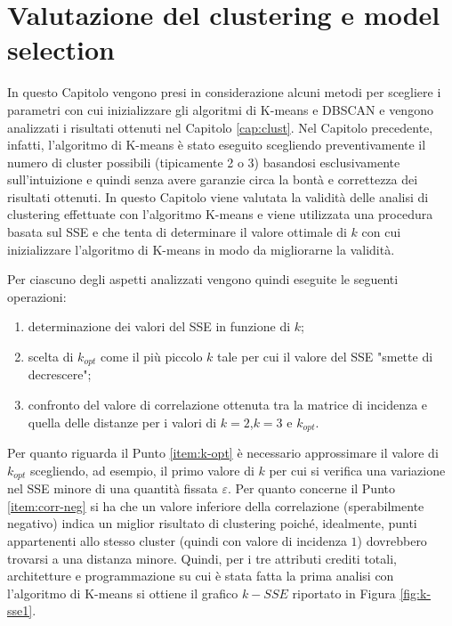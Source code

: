 \documentclass[12pt]{article}
\begin{document}
\section{Valutazione del clustering e model selection}
\label{cap:val-clust}
In questo Capitolo vengono presi in considerazione alcuni metodi per scegliere i parametri con cui inizializzare gli algoritmi di K-means e DBSCAN e vengono analizzati i risultati ottenuti nel Capitolo \ref{cap:clust}.
Nel Capitolo prece\-dente, infatti, l'algoritmo di K-means è stato eseguito scegliendo preventi\-vamente il numero di cluster possibili (tipicamente 2 o 3) basandosi esclu\-sivamente sull'intuizione e quindi senza avere garanzie circa la bontà e corret\-tezza dei risultati ottenuti. 
In questo Capitolo viene valutata la vali\-dità delle analisi di clustering effettuate con l'algoritmo K-means e viene utilizzata una procedura basata sul SSE e che tenta di determinare il valore ottimale di $k$ con cui inizializzare l'algoritmo di K-means in modo da mi\-gliorarne la validità. 

Per ciascuno degli aspetti analizzati vengono quindi eseguite le seguenti operazioni:

\begin{enumerate}
\item determinazione dei valori del SSE in funzione di $k$;
\item \label{item:k-opt} scelta di $k_{opt}$ come il più piccolo $k$ tale per cui il valore del SSE "smette di decrescere";
\item \label{item:corr-neg} confronto del valore di correlazione ottenuta tra la matrice di incidenza e quella delle distanze per i valori di $k=2$,$k=3$ e $k_{opt}$.
\end{enumerate}
Per quanto riguarda il Punto \ref{item:k-opt} è necessario approssimare il valore di $k_{opt}$ scegliendo, ad esempio, il primo valore di $k$ per cui si verifica una varia\-zione nel SSE minore di una quantità fissata $\varepsilon$. 
Per quanto concerne il Punto \ref{item:corr-neg} si ha che un valore inferiore della correlazione (sperabilmente negativo) indica un miglior risultato di clustering poiché, idealmente, punti appartenenti allo stesso cluster (quindi con valore di incidenza $1$) dovreb\-bero trovarsi a una distanza minore. Quindi, per i tre attributi crediti totali, architetture e programmazione su cui è stata fatta la prima analisi con l'algoritmo di K-means si ottiene il grafico $k-SSE$ riportato in Figura \ref{fig:k-sse1}.
\end{document}
